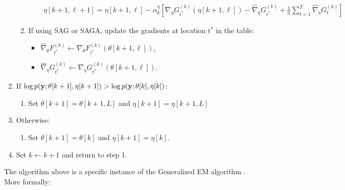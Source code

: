 \begin{enumerate}
\begin{enumerate}
\begin{enumerate}
\begin{gather}
                \eta[k+1,\ell+1] = \eta[k+1,\ell] - \alpha^{\eta}_k \left[\nabla_\eta G_{t^*}^{(k)}(\eta[k+1,\ell]) - \widehat \nabla_\eta G_{t^*}^{(k)} + \frac{1}{n} \sum_{t=1}^T \widehat \nabla_\eta G^{(k)}_{t} \right]
            \end{gather}
        \end{enumerate}
        \item If using SAG or SAGA, update the gradients at location $t^*$ in the table:
        \begin{itemize}
            \item $\widehat \nabla_\theta F_{t^*}^{(k)} \leftarrow \nabla_\theta F_{t^*}^{(k)}(\theta[k+1,\ell])$,
            \item $\widehat \nabla_\eta G_{t^*}^{(k)} \leftarrow \nabla_\eta G_{t^*}^{(k)}(\theta[k+1,\ell])$.
        \end{itemize}
    \end{enumerate}
    \item If $\log p(\mathbf{y} ; \theta[k+1],\eta[k+1]) > \log p(\mathbf{y} ; \theta[k],\eta[k])$:
    \begin{enumerate}
        \item Set $\theta[k+1] = \theta[k+1,L]$ and $\eta[k+1] = \eta[k+1,L]$
    \end{enumerate}
    \item Otherwise:
    \begin{enumerate}
        \item Set $\theta[k+1] = \theta[k]$ and $\eta[k+1] = \eta[k]$.
    \end{enumerate} 
    \item Set $k \leftarrow k+1$ and return to step 1.
\end{enumerate}

The algorithm above is a specific instance of the Generalized EM algorithm \citep{Dempster:1977}. More formally:

